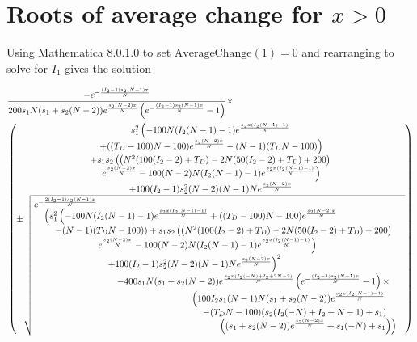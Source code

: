 \documentclass[preprint,10pt,reqno]{report}
\begin{document}
 \section{Roots of average change for $x>0$}
 \label{approots}
 Using Mathematica 8.0.1.0 to set $\text{AverageChange}(1)=0$ and rearranging to solve for $I_1$ gives the solution
 \begin{small}
 \begin{align}
 \label{lbr}
&\frac{-e^{-\frac{(I_2-1) s_2 (N-1) x}{N}} }{200 s_1 N (s_1+s_2 (N-2)) e^{\frac{s_2
   (N-2) x}{N}} \left(e^{-\frac{(I_2-1) s_2
   (N-1) x}{N}}-1\right)}\times \\
&\begin{pmatrix}
\begin{matrix}
s_1^2   \left(-100 N (I_2 (N-1)-1) e^{\frac{s_2 x   (I_2 (N-1)-1)}{N}} \right. \\
   \left. +((T_D-100) N-100)   e^{\frac{s_2 (N-2) x}{N}}-(N-1) (T_D   N-100)\right) \\
   +s_1 s_2 \left(\left(N^2 (100   (I_2-2)+T_D)-2 N (50 (I_2-2)+T_D)+200\right)\right. \\
  \left. e^{\frac{s_2 (N-2) x}{N}}-100 (N-2)   N (I_2 (N-1)-1) e^{\frac{s_2 x (I_2   (N-1)-1)}{N}}\right)\\
   +100 (I_2-1) s_2^2   (N-2) (N-1) N e^{\frac{s_2 (N-2)   x}{N}}
   \end{matrix} \\
\pm \sqrt{ \splitfrac{e^{-\frac{2 (I_2-1) s_2 (N-1)  x}{N}}}
{\splitfrac{ \left(s_1^2 \left(-100 N (I_2   (N-1)-1) e^{\frac{s_2 x (I_2   (N-1)-1)}{N}}+((T_D-100) N-100)   e^{\frac{s_2 (N-2) x}{N}}\right. \right. }
{\splitfrac{\left. -(N-1) (T_D N-100)\right)+s_1 s_2 \left(\left(N^2 (100   (I_2-2)+T_D)-2 N (50 (I_2-2)+T_D)+200\right) \right.}
{\splitfrac{   \left. e^{\frac{s_2 (N-2) x}{N}}-100 (N-2)   N (I_2 (N-1)-1) e^{\frac{s_2 x (I_2   (N-1)-1)}{N}}\right)}
{\splitfrac{\left. +100 (I_2-1) s_2^2   (N-2) (N-1) N e^{\frac{s_2 (N-2)   x}{N}}\right)^2}
{\splitfrac{-400 s_1 N (s_1+s_2   (N-2)) e^{\frac{s_2 x (I_2 (-N)+I_2+2   N-3)}{N}} \left(e^{-\frac{(I_2-1) s_2   (N-1) x}{N}}-1\right) \times}
{\splitfrac{ \left(100 I_2 s_1   (N-1) N (s_1+s_2 (N-2))   e^{\frac{s_2 x (I_2 (N-1)-1)}{N}}\right.}
{\splitfrac{\left.-(T_D   N-100) (s_2 (I_2   (-N)+I_2+N-1)+s_1)\right.}{\left. \left((s_1+s_2   (N-2)) e^{\frac{s_2 (N-2) x}{N}}+s_1   (-N)+s_1\right)\right)}}}}}}}}} 
\end{pmatrix} \notag
   \end{align}
   \end{small}
\end{document}
